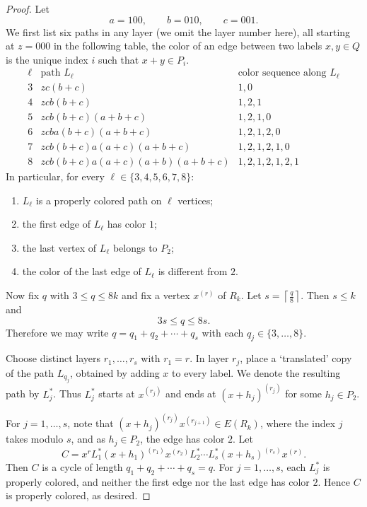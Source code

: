\documentclass[12pt]{article}
\begin{document}
\begin{proof}
Let
\[
a=100,
\qquad
b=010,
\qquad
c=001.
\]
We first list six paths in any layer (we omit the layer number here), all starting at $z=000$ in the following table,  the color of an edge between two labels $x,y\in Q$ is the unique index $i$ such that $x+y\in P_i$. 
\[
\begin{array}{c|l|l}
\ell & \text{path }L_\ell & \text{color sequence along }L_\ell\\
\hline
3 & zc(b+c) & 1,0 \\
4 & zcb(b+c) & 1,2,1 \\
5 & zcb(b+c)(a+b+c) & 1,2,1,0\\
6 & zcba(b+c)(a+b+c) & 1,2,1,2,0 \\
7 & zcb(b+c)a(a+c)(a+b+c) & 1,2,1,2,1,0 \\
8 & zcb(b+c)a(a+c)(a+b)(a+b+c) & 1,2,1,2,1,2,1
\end{array}
\]
 In particular, for every $\ell\in\{3,4,5,6,7,8\}$:
\begin{enumerate}[label=(\alph*)]
\item $L_\ell$ is a properly colored path on $\ell$ vertices;
\item the first edge of $L_\ell$ has color $1$;
\item the last vertex of $L_\ell$ belongs to $P_2$;
\item the color of the last edge of $L_\ell$ is different from $2$.
\end{enumerate}

Now fix $q$ with $3\le q\le 8k$ and fix a vertex $x^{(r)}$ of $R_k$. Let $s=\left\lceil \frac{q}{8}\right\rceil$.
Then $s\le k$ and
\[
3s\le q\le 8s.
\]
Therefore we may write
$q=q_1+q_2+\cdots+q_s$
with each $q_j\in\{3,\dots,8\}$. %

Choose distinct layers $r_1,\ldots,r_s$ with $r_1=r$. In layer $r_j$, place a `translated' copy of the path $L_{q_j}$, obtained by adding $x$ to every label. We denote the resulting path by $L_j^*$. Thus $L_j^*$ starts at $x^{(r_j)}$ and ends at $(x+h_j)^{(r_j)}$ for some $h_j\in P_2$.

For $j=1,\ldots,s$, note that $(x+h_j)^{(r_j)}x^{(r_{j+1})}\in E(R_k)$, where the index $j$ takes modulo $s$, and as $h_j\in P_2$, the edge has color $2$.
Let \[
C=x^{r}L_1^*(x+h_1)^{(r_1)}x^{(r_{2})}L_2^*\cdots L_s^*(x+h_s)^{(r_s)}x^{(r)}.
\]
Then $C$ is a cycle of length $q_1+q_2+\cdots+q_s=q$. 
For $j=1,\dots,s$, each $L_j^*$ is properly colored, and neither the first edge nor the last edge has color $2$. Hence $C$ is properly colored, as desired.
\end{proof}
\end{document}

